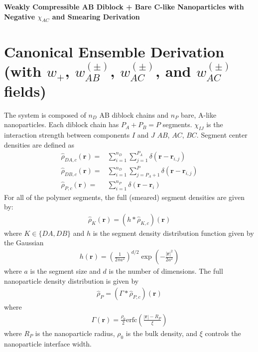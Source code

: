 \documentclass{article}
\begin{document}
\begin{center}
  \textbf{Weakly Compressible AB Diblock + Bare C-like Nanoparticles with
    Negative $\chi_{AC}$ and Smearing Derivation}
\end{center}

\section{Canonical Ensemble Derivation (with $w_+$, $w_{AB}^{(\pm)}$,
  $w_{AC}^{(\pm)}$, and $w_{AC}^{(\pm)}$ fields)}

The system is composed of $n_D$ AB diblock chains and $n_P$ bare, A-like
  nanoparticles.
Each diblock chain has $P_A + P_B = P$ segments.
$\chi_{IJ}$ is the interaction strength between components $I$ and $J$
  $AB$, $AC$, $BC$.
Segment center densities are defined as
\begin{align*}
  \hat{\rho}_{DA,c} (\mathbf{r}) =&
    \sum_{i=1}^{n_D} \sum_{j=1}^{P_A}
    \delta(\mathbf{r} - \mathbf{r}_{i,j}) \\
  \hat{\rho}_{DB,c} (\mathbf{r}) =&
    \sum_{i=1}^{n_D} \sum_{j=P_A+1}^{P}
    \delta(\mathbf{r} - \mathbf{r}_{i,j}) \\
  \hat{\rho}_{P,c} (\mathbf{r}) =&
    \sum_{i=1}^{n_P}
    \delta(\mathbf{r} - \mathbf{r}_i)
\end{align*}
For all of the polymer segments, the full (smeared) segment densities are given
  by:
\begin{align*}
  \hat{\rho}_K(\mathbf{r}) = (h \ast \hat{\rho}_{K,c})(\mathbf{r})
\end{align*}
where $K \in \{ DA, DB\}$ and $h$ is the segment density distribution
  function given by the Gaussian
\begin{align*}
  h(\mathbf{r}) = \left( \frac{1}{2\pi a^2} \right)^{d/2}
  \exp \left( - \frac{|\mathbf{r}|^2}{2a^2}  \right)
\end{align*}
where $a$ is the segment size and $d$ is the number of dimensions.
The full nanoparticle density distribution is given by
\begin{align*}
  \hat{\rho}_P = (\Gamma \ast \hat{\rho}_{P,c}) (\mathbf{r})
\end{align*}
where
\begin{align*}
  \Gamma(\mathbf{r}) = \frac{\rho_0}{2}
    \textrm{erfc} \left( \frac{|\mathbf{r}| - R_P}{\xi}  \right)
\end{align*}
where $R_P$ is the nanoparticle radius, $\rho_0$ is the bulk density,
  and $\xi$ controls the nanoparticle interface width.
\end{document}
